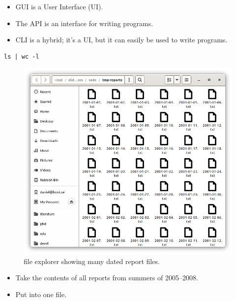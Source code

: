 \begin{frame}[fragile]
  \begin{solution}
    \begin{itemize}
      \item GUI is a User Interface (UI).
      \item The API is an interface for writing programs.
      \item CLI is a hybrid; it's a UI, but it can easily be used to write 
        programs.
    \end{itemize}
  \end{solution}

  \begin{example}
    \begin{verbatim}
ls | wc -l
    \end{verbatim}
  \end{example}
\end{frame}

\begin{frame}
  \begin{figure}
    \includegraphics[height=0.5\textheight]{fig/many-reports.png}
    \caption{file explorer showing many dated report files.}
  \end{figure}

  \begin{exercise}
    \begin{itemize}
      \item Take the contents of all reports from summers of 2005--2008.
      \item Put into one file.
    \end{itemize}
  \end{exercise}
\end{frame}

